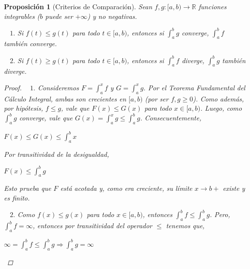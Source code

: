 \documentclass[]{article}
\newtheorem{prop}[teo]{Proposición}
\def\R{\mathbb{R}}
\newcommand{\intres}[3]{\int_{#1}^{#2} \! #3}
\begin{document}
\begin{prop}[Criterios de Comparación]
	Sean $f,g:[a,b)\to\R$ funciones integrables ($b$ puede ser $+\infty$) y no negativas. 
	
	~\newline
	$1.$ Si $f(t)\leq g(t)$ para todo $t\in[a,b)$, entonces si $\intres{a}{b}{g}$ converge, $\intres{a}{b}{f}$ también converge.
	
	~\newline
	$2.$ Si $f(t)\geq g(t)$ para todo $t\in[a,b)$, entonces si $\intres{a}{b}{f}$ diverge, $\intres{a}{b}{g}$ también diverge.
	\begin{proof}
		
		~\newline
		$1.$ Consideremos $F=\intres{a}{x}{f}$ y $G=\intres{a}{x}{g}$. Por el Teorema Fundamental del Cálculo Integral, ambas son crecientes en $[a,b)$ (por ser $f,g \geq 0$). Como además, por hipótesis, $f\leq g$, vale que $F(x)\leq G(x)$ para todo $x\in[a,b)$.
		Luego, como $\intres{a}{b}{g}$ converge, vale que $G(x) = \intres{a}{x}{g} \leq \intres{a}{b}{g}$. Consecuentemente,
		\begin{center}
			$F(x) \leq G(x) \leq \intres{a}{b}{x}$
		\end{center}
		Por transitividad de la desigualdad,
		\begin{center}
			$F(x) \leq \intres{a}{b}{g}$
		\end{center}
		Esto prueba que $F$ está acotada y, como era creciente, su límite $x\to b+$ existe y es finito.
		
		~\newline
		$2.$ Como $f(x)\leq g(x)$ para todo $x\in [a,b)$, entonces $\intres{a}{b}{f}\leq\intres{a}{b}{g}$. Pero, $\intres{a}{b}{f} = \infty$, entonces por transitividad del operador $\leq$ tenemos que,
		\begin{center}
			$\infty=\intres{a}{b}{f}\leq\intres{a}{b}{g} \Rightarrow \intres{a}{b}{g} = \infty$
		\end{center}
	\end{proof}
\end{prop}

\newpage
\end{document}
